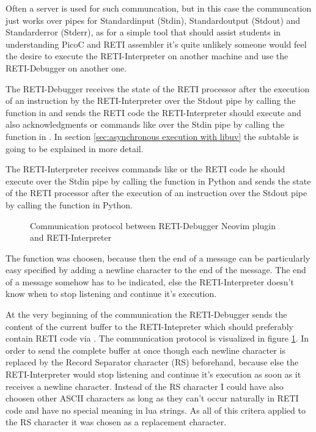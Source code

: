 \documentclass{report}
\begin{document}
Often a server is used for such communcation, but in this case the communcation just works over \alert{pipes} for Standardinput (\alert{Stdin}), Standardoutput (\alert{Stdout}) and Standarderror (\alert{Stderr}), as for a simple tool that should assist students in understanding PicoC and RETI assembler it's quite unlikely someone would feel the desire to execute the RETI-Interpreter on another machine and use the RETI-Debugger on another one.

The RETI-Debugger receives the state of the RETI processor after the execution of an instruction by the RETI-Interpreter over the Stdout pipe by calling the  function in  and sends the RETI code the RETI-Interpreter should execute and also acknowledgments or commands like  over the Stdin pipe by calling the  function in . In section \ref{sec:asynchronous execution with libuv}  the subtable  is going to be explained in more detail.

The RETI-Interpreter receives commands like  or the RETI code he should execute over the Stdin pipe by calling the  function in Python and sends the state of the RETI processor after the execution of an instruction over the Stdout pipe by calling the  function in Python.

\begin{figure}
	\centering
	\caption{Communication protocol between RETI-Debugger Neovim plugin and RETI-Interpreter}
	\label{fig:communication reti debugger and reti interpreter}
\end{figure}


The  function was choosen, because then the end of a message can be particularly easy specified by adding a newline character  to the end of the message. The end of a message somehow has to be indicated, else the RETI-Interpreter doesn't know when to stop listening and continue it's execution.

At the very beginning of the communication the RETI-Debugger sends the content of the current buffer to the RETI-Intepreter which should preferably contain RETI code via  . The \alert{communication protocol} is visualized in figure \ref{fig:communication reti debugger and reti interpreter}. In order to send the complete buffer at once though each newline character  is replaced by the Record Separator character (\alert{RS})  beforehand, because else the RETI-Interpreter would stop listening and continue it's execution as soon as it receives a newline character. Instead of the RS character I could have also choosen other ASCII characters as long as they can't occur naturally in RETI code and have no special meaning in lua strings. As all of this critera applied to the RS character it was chosen as a replacement character.
\end{document}
